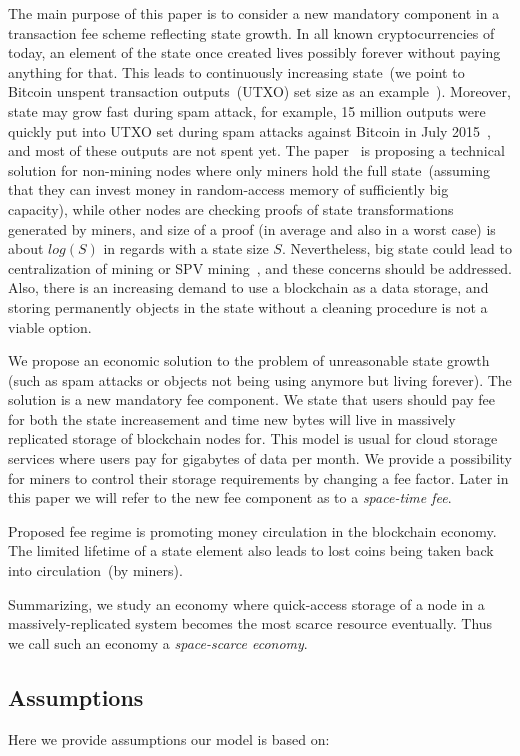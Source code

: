 \documentclass[]{llncs}   %
\begin{document}
The main purpose of this paper is to consider a new mandatory component in a transaction fee scheme reflecting state growth. In all known cryptocurrencies of today, an element of the state once created lives possibly forever without paying anything for that. This leads to continuously increasing state~(we point to Bitcoin unspent transaction outputs~(UTXO) set size as an example~\cite{utxoChart}). Moreover, state may grow fast during spam attack, for example, 15 million outputs were quickly put into UTXO set during spam attacks against Bitcoin in July 2015~\cite{bitcoin2015flood}, and most of these outputs are not spent yet. The paper~\cite{reyzin2016improving} is proposing a technical solution for non-mining nodes where only miners hold the full state~(assuming that they can invest money in  random-access memory of sufficiently big capacity), while other nodes are checking proofs of state transformations generated by miners, and size of a proof (in average and also in a worst case) is about $log(S)$ in regards with a state size $S$. Nevertheless, big state could lead to centralization of mining or SPV mining~\cite{spvMining}, and these concerns should be addressed. Also, there is an increasing demand to use a blockchain as a data storage, and storing permanently objects in the state without a cleaning procedure is not a viable option.

We propose an economic solution to the problem of unreasonable state growth (such as spam attacks or objects not being using anymore but living forever). The solution is a new mandatory fee component. We state that users should pay fee for both the state increasement and time new bytes will live in massively replicated storage of blockchain nodes for. This model is usual for cloud storage services where users pay for gigabytes of data per month. We provide a possibility for miners to control their storage requirements by changing a fee factor. Later in this paper we will refer to the new fee component as to a \textit{space-time fee}.

Proposed fee regime is promoting money circulation in the blockchain economy. The limited lifetime of a state element also leads to lost coins being taken back into circulation~(by miners). 

Summarizing, we study an economy where quick-access storage of a node in a massively-replicated system becomes the most scarce resource eventually. Thus we call such an economy a \textit{space-scarce economy}.

\subsection{Assumptions}
Here we provide assumptions our model is based on:
\end{document}
